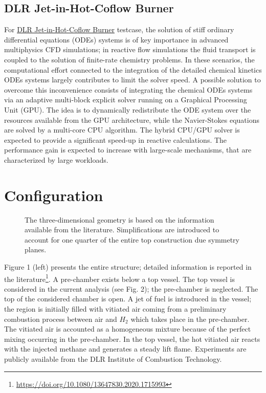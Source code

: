 \subsection{DLR Jet-in-Hot-Coflow Burner}
For \href{https://develop.openfoam.com/committees/hpc/-/tree/develop/combustion/reactingFoam/LES/DLRJHC}{DLR Jet-in-Hot-Coflow Burner} testcase, 
the solution of stiff ordinary differential equations (ODEs) systems is of key importance in advanced multiphysics CFD simulations; in reactive flow simulations the fluid transport is coupled to the solution of finite-rate chemistry problems. In these scenarios, the computational effort connected to the integration of the detailed chemical kinetics ODEs systems largely contributes to limit the solver speed. A possible solution to overcome this inconvenience consists of integrating the chemical ODEs systems via an adaptive multi-block explicit solver running on a Graphical Processing Unit (GPU). The idea is to dynamically redistribute the ODE system over the resources available from the GPU architecture, while the Navier-Stokes equations are solved by a multi-core CPU algorithm. The hybrid CPU/GPU solver is expected to provide a significant speed-up in reactive calculations. The performance gain is expected to increase with large-scale mechanisms, that are characterized by large workloads.

\section*{Configuration}
\begin{figure}[h]
    \centering
    \caption{The three-dimensional geometry is based on the information available from the literature. Simplifications are introduced to account for one quarter of the entire top construction due symmetry planes.}
\end{figure}

Figure 1 (left) presents the entire structure; detailed information is reported in the literature\footnote{\url{https://doi.org/10.1080/13647830.2020.1715993}}. A pre-chamber exists below a top vessel. The top vessel is considered in the current analysis (see Fig. 2); the pre-chamber is neglected. The top of the considered chamber is open. A jet of fuel is introduced in the vessel; the region is initially filled with vitiated air coming from a preliminary combustion process between air and $H_2$ which takes place in the pre-chamber. The vitiated air is accounted as a homogeneous mixture because of the perfect mixing occurring in the pre-chamber. In the top vessel, the hot vitiated air reacts with the injected methane and generates a steady lift flame. Experiments are publicly available from the DLR Institute of Combustion Technology. 

